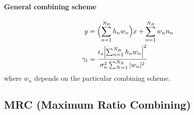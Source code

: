 \documentclass[a4paper, 10pt]{article}
\begin{document}
\paragraph{General combining scheme}
\begin{align*}
	y &= \Bigl (\sum_{n = 1}^{N_R}h_nw_n\Bigr )x + \sum_{n = 1}^{N_R}w_nn_n \\
	\gamma _t &= \frac{\epsilon _s \Bigl | \sum_{n = 1}^{N_R}h_nw_n\Bigr |^2 }{\sigma _n^2 \sum_{N = 1}^{N_R}|w_n|^2}
\end{align*}
where \begin{math} w_n\end{math} depends on the particular combining scheme.
\subsection{MRC (Maximum Ratio Combining)}
\end{document}
